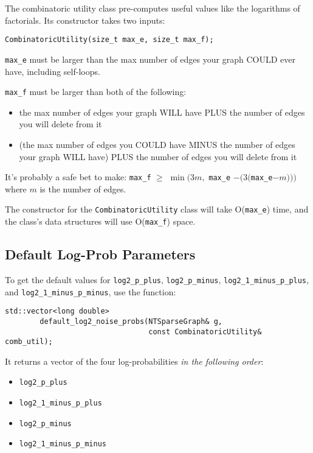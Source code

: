\documentclass{article}
\begin{document}
The combinatoric utility class pre-computes useful values like the logarithms of factorials. Its constructor takes two inputs:

\begin{verbatim}
CombinatoricUtility(size_t max_e, size_t max_f);
\end{verbatim}

\verb|max_e| must be larger than the max number of edges your graph COULD ever have, including self-loops.

\verb|max_f| must be larger than both of the following:
\begin{itemize}
    \item the max number of edges your graph WILL have PLUS the number of edges you will delete from it
    \item (the max number of edges you COULD have MINUS the number of edges your graph WILL have) PLUS the number of edges you will delete from it
\end{itemize}

It's probably a safe bet to make: \verb|max_f| $\geq$ $\min(3m,$ \verb|max_e| $- (3($\verb|max_e|$ - m)))$ where $m$ is the number of edges.

The constructor for the \verb|CombinatoricUtility| class will take O(\verb|max_e|) time, and the class's data structures will use O(\verb|max_f|) space.

\subsection{Default Log-Prob Parameters}\label{sec:log_probs}

To get the default values for \verb|log2_p_plus|, \verb|log2_p_minus|, \verb|log2_1_minus_p_plus|, and \verb|log2_1_minus_p_minus|, use the function:

\begin{verbatim}
std::vector<long double>
        default_log2_noise_probs(NTSparseGraph& g,
                                 const CombinatoricUtility& comb_util);
\end{verbatim}

It returns a vector of the four log-probabilities \emph{in the following order}:

\begin{itemize}
    \setlength\itemsep{0em}
    \item \verb|log2_p_plus|
    \item \verb|log2_1_minus_p_plus|
    \item \verb|log2_p_minus|
    \item \verb|log2_1_minus_p_minus|
\end{itemize}
\end{document}
